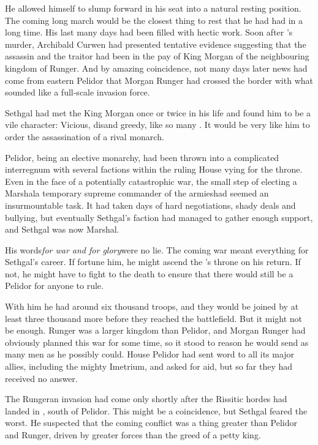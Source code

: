 He allowed himself to slump forward in his seat into a natural \scathaese resting position. 
The coming long march would be the closest thing to rest that he had had in a long time. 
His last many days had been filled with hectic work. 
Soon after \Icor's murder, Archibald Curwen had presented tentative evidence suggesting that the assassin and the traitor \Onatol had been in the pay of King Morgan of the neighbouring kingdom of Runger.
And by amazing coincidence, not many days later news had come from eastern Pelidor that Morgan Runger had crossed the border with what sounded like a full-scale invasion force. 

Sethgal had met the \human King Morgan once or twice in his life and found him to be a vile character: 
Vicious, dis\honourable and greedy, like so many \humans. 
It would be very like him to order the assassination of a rival monarch. 

Pelidor, being an elective monarchy, had been thrown into a complicated interregnum with several factions within the ruling House vying for the throne. 
Even in the face of a potentially catastrophic war, the small step of electing a Marshal\dash a temporary supreme commander of the armies\dash had seemed an insurmountable task. 
It had taken days of hard negotiations, shady deals and bullying, but eventually Sethgal's faction had managed to gather enough support, and Sethgal was now Marshal. 

His words\dash\emph{for war and for glory}\dash were no lie.
The coming war meant everything for Sethgal's career. 
If fortune \favoured him, he might ascend the \rayuth's throne on his return.
If not, he might have to fight to the death to ensure that there would still be a Pelidor for anyone to rule. 

With him he had around six thousand troops, and they would be joined by at least three thousand more before they reached the battlefield. 
But it might not be enough. 
Runger was a larger kingdom than Pelidor, and Morgan Runger had obviously planned this war for some time, so it stood to reason he would send as many men as he possibly could. 
House Pelidor had sent word to all its major allies, including the mighty Imetrium, and asked for aid, but so far they had received no answer. 

The Rungeran invasion had come only shortly after the Rissitic hordes had landed in \Scyrum, south of Pelidor. 
This might be a coincidence, but Sethgal feared the worst. 
He suspected that the coming conflict was a thing greater than Pelidor and Runger, driven by greater forces than the greed of a petty \human king. 

